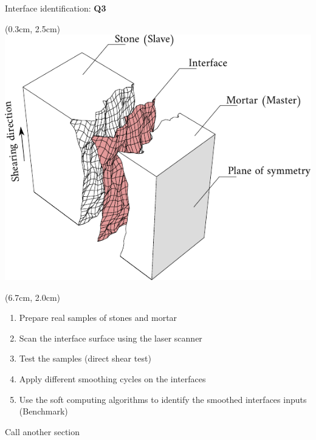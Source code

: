 \documentclass{EESD}
\begin{document}
\begin{frame}{Interface identification: \textcolor{myviolet}{\textbf{Q3}}}\vspace{4pt}
    \begin{textblock*}{10cm}(0.3cm, 2.5cm)
        \includegraphics[height = 0.5\textwidth]{Interface.pdf}
    \end{textblock*}
    \begin{textblock*}{10cm}(6.7cm, 2.0cm)
    \begin{enumerate}
        \item Prepare real samples of stones and mortar\vspace{10pt}\pause
        \item Scan the interface surface using the laser scanner\vspace{10pt}\pause
        \item Test the samples (direct shear test)\vspace{10pt}\pause
        \item Apply different smoothing cycles on the interfaces\vspace{10pt}\pause
        \item Use the soft computing algorithms to identify the smoothed interfaces inputs (Benchmark)
    \end{enumerate}
    \end{textblock*}
\end{frame}

\begin{frame}{Call another section}
    
\end{frame}

\end{document}
